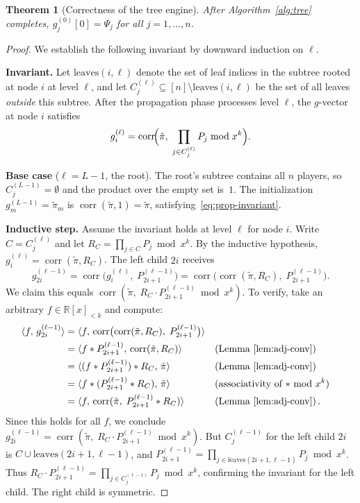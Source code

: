 \documentclass[11pt]{article}
\newtheorem{theorem}{Theorem}[section]
\DeclareMathOperator{\corr}{corr}
\newcommand{\ip}[2]{\langle #1,\, #2 \rangle}
\begin{document}
\begin{theorem}[Correctness of the tree engine]\label{thm:tree-correct}
After Algorithm~\ref{alg:tree} completes, $g^{(0)}_j[0] = \Psi_j$ for all
$j = 1, \ldots, n$.
\end{theorem}
\begin{proof}
We establish the following invariant by downward induction on $\ell$.

\textbf{Invariant.} Let $\mathrm{leaves}(i,\ell)$ denote the set of leaf
indices in the subtree rooted at node $i$ at level $\ell$, and let
$C_j^{(\ell)} \subseteq [n] \setminus \mathrm{leaves}(i,\ell)$ be the set
of all leaves \emph{outside} this subtree.  After the propagation phase
processes level $\ell$, the $g$-vector at node $i$ satisfies
\begin{equation}\label{eq:prop-invariant}
  g^{(\ell)}_i = \corr\!\Bigl(\tilde\pi,\;
    \prod_{j \in C_j^{(\ell)}} P_j \bmod x^k \Bigr).
\end{equation}

\textbf{Base case} ($\ell = L{-}1$, the root). The root's subtree
contains all $n$ players, so $C_j^{(L-1)} = \emptyset$ and the product
over the empty set is~$1$.  The initialization
$g^{(L-1)}_m = \tilde\pi_m$ is $\corr(\tilde\pi, 1) = \tilde\pi$,
satisfying~\eqref{eq:prop-invariant}.

\textbf{Inductive step.} Assume the invariant holds at level $\ell$
for node $i$.  Write $C = C_j^{(\ell)}$ and let $R_C = \prod_{j \in C}
P_j \bmod x^k$.  By the inductive hypothesis, $g^{(\ell)}_i =
\corr(\tilde\pi, R_C)$.  The left child $2i$ receives
\[
  g^{(\ell-1)}_{2i}
  = \corr\bigl(g^{(\ell)}_i,\; P^{(\ell-1)}_{2i+1}\bigr)
  = \corr\!\bigl(\corr(\tilde\pi, R_C),\; P^{(\ell-1)}_{2i+1}\bigr).
\]
We claim this equals $\corr(\tilde\pi,\; R_C \cdot P^{(\ell-1)}_{2i+1}
\bmod x^k)$.  To verify, take an arbitrary $f \in \mathbb{R}[x]_{<k}$
and compute:
\begin{align*}
  \ip{f}{g^{(\ell-1)}_{2i}}
  &= \ip{f}{\corr\bigl(\corr(\tilde\pi, R_C),\; P^{(\ell-1)}_{2i+1}\bigr)}
  \\
  &= \ip{f * P^{(\ell-1)}_{2i+1}}{\corr(\tilde\pi, R_C)}
    &&\text{(Lemma~\ref{lem:adj-conv})}
  \\
  &= \ip{(f * P^{(\ell-1)}_{2i+1}) * R_C}{\tilde\pi}
    &&\text{(Lemma~\ref{lem:adj-conv})}
  \\
  &= \ip{f * (P^{(\ell-1)}_{2i+1} * R_C)}{\tilde\pi}
    &&\text{(associativity of $*$ mod $x^k$)}
  \\
  &= \ip{f}{\corr(\tilde\pi,\; P^{(\ell-1)}_{2i+1} * R_C)}
    &&\text{(Lemma~\ref{lem:adj-conv})}\,.
\end{align*}
Since this holds for all $f$, we conclude
$g^{(\ell-1)}_{2i} = \corr(\tilde\pi,\; R_C \cdot P^{(\ell-1)}_{2i+1}
\bmod x^k)$.  But $C_j^{(\ell-1)}$ for the left child $2i$ is
$C \cup \mathrm{leaves}(2i{+}1, \ell{-}1)$, and
$P^{(\ell-1)}_{2i+1} = \prod_{j \in \mathrm{leaves}(2i+1,\ell-1)} P_j
\bmod x^k$.  Thus $R_C \cdot P^{(\ell-1)}_{2i+1} =
\prod_{j \in C_j^{(\ell-1)}} P_j \bmod x^k$, confirming the invariant
for the left child.  The right child is symmetric.


\end{proof}
\end{document}
